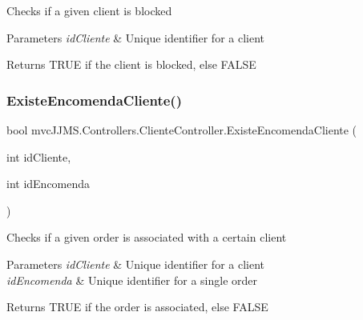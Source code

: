 Checks if a given client is blocked 


\begin{DoxyParams}{Parameters}
{\em id\+Cliente} & Unique identifier for a client\\
\hline
\end{DoxyParams}
\begin{DoxyReturn}{Returns}
T\+R\+UE if the client is blocked, else F\+A\+L\+SE
\end{DoxyReturn}
\mbox{\label{classmvc_j_j_m_s_1_1_controllers_1_1_cliente_controller_a5ab387b5c0be1e73a0ec1c468cc3ac5e}} 
\subsubsection{\texorpdfstring{Existe\+Encomenda\+Cliente()}{ExisteEncomendaCliente()}}
{\footnotesize\ttfamily bool mvc\+J\+J\+M\+S.\+Controllers.\+Cliente\+Controller.\+Existe\+Encomenda\+Cliente (\begin{DoxyParamCaption}\item[{int}]{id\+Cliente,  }\item[{int}]{id\+Encomenda }\end{DoxyParamCaption})\hspace{0.3cm}{\ttfamily [inline]}}



Checks if a given order is associated with a certain client 


\begin{DoxyParams}{Parameters}
{\em id\+Cliente} & Unique identifier for a client\\
\hline
{\em id\+Encomenda} & Unique identifier for a single order\\
\hline
\end{DoxyParams}
\begin{DoxyReturn}{Returns}
T\+R\+UE if the order is associated, else F\+A\+L\+SE
\end{DoxyReturn}
\mbox{\label{classmvc_j_j_m_s_1_1_controllers_1_1_cliente_controller_a626d408a5094fabc40454be45b143ab2}} 
